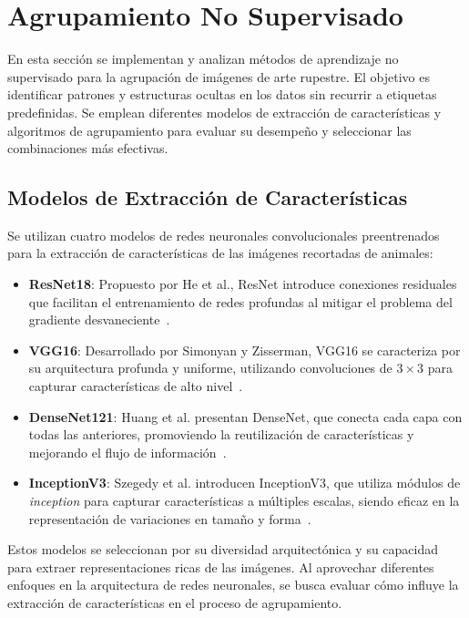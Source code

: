 \section{Agrupamiento No Supervisado}
\label{sec:unsup}

En esta sección se implementan y analizan métodos de aprendizaje no supervisado para la agrupación de imágenes de arte rupestre.
El objetivo es identificar patrones y estructuras ocultas en los datos sin recurrir a etiquetas predefinidas.
Se emplean diferentes modelos de extracción de características y algoritmos de agrupamiento para evaluar su desempeño y seleccionar las combinaciones más efectivas.

\subsection{Modelos de Extracción de Características}

Se utilizan cuatro modelos de redes neuronales convolucionales preentrenados para la extracción de características de las imágenes recortadas de animales:

\begin{itemize}
    \item \textbf{ResNet18}: Propuesto por He et al., ResNet introduce conexiones residuales que facilitan el entrenamiento de redes profundas al mitigar el problema del gradiente desvaneciente~\cite{he2016deep}.
    \item \textbf{VGG16}: Desarrollado por Simonyan y Zisserman, VGG16 se caracteriza por su arquitectura profunda y uniforme, utilizando convoluciones de $3 \times 3$ para capturar características de alto nivel~\cite{simonyan2014very}.
    \item \textbf{DenseNet121}: Huang et al. presentan DenseNet, que conecta cada capa con todas las anteriores, promoviendo la reutilización de características y mejorando el flujo de información~\cite{huang2017densely}.
    \item \textbf{InceptionV3}: Szegedy et al. introducen InceptionV3, que utiliza módulos de \textit{inception} para capturar características a múltiples escalas, siendo eficaz en la representación de variaciones en tamaño y forma~\cite{szegedy2016rethinking}.
\end{itemize}

Estos modelos se seleccionan por su diversidad arquitectónica y su capacidad para extraer representaciones ricas de las imágenes.
Al aprovechar diferentes enfoques en la arquitectura de redes neuronales, se busca evaluar cómo influye la extracción de características en el proceso de agrupamiento.

